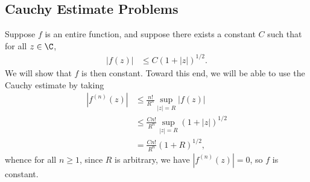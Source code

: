 \documentclass[10pt]{mypackage}
\begin{document}
\subsection{Cauchy Estimate Problems}%
\begin{example}
  Suppose $f$ is an entire function, and suppose there exists a constant $C$ such that for all $z\in \C$,
  \begin{align*}
    \left\vert f(z) \right\vert &\leq C\left( 1 + \left\vert z \right\vert \right)^{1/2}.
  \end{align*}
  We will show that $f$ is then constant. Toward this end, we will be able to use the Cauchy estimate by taking
  \begin{align*}
    \left\vert f^{(n)}(z) \right\vert &\leq \frac{n!}{R^{n}} \sup_{\left\vert z \right\vert = R} \left\vert f(z) \right\vert\\
                                      &\leq \frac{Cn!}{R^{n}} \sup_{\left\vert z \right\vert = R} \left( 1 + \left\vert z \right\vert \right)^{1/2}\\
                                      &= \frac{Cn!}{R^{n}} \left( 1 + R \right)^{1/2},
  \end{align*}
  whence for all $n\geq 1$, since $R$ is arbitrary, we have $\left\vert f^{(n)}\left( z \right) \right\vert = 0$, so $f$ is constant.
\end{example}
\end{document}
